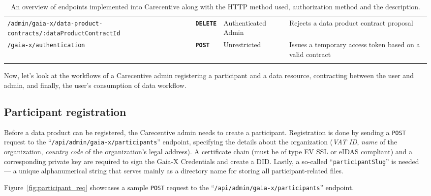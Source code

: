 \begin{longtable}{ |p{4cm}|p{2cm}|p{3cm}|p{6cm}| }
    \hhline{----}
    \texttt{/admin/gaia-x/data-product-contracts/:dataProductContractId} & \textbf{\texttt{DELETE}} & Authenticated Admin & Rejects a data product contract proposal\\
    \hhline{----}
    \texttt{/gaia-x/authentication} & \textbf{\texttt{POST}} & Unrestricted & Issues a temporary access token based on a valid contract\\
    \hhline{----}
    \caption{An overview of endpoints implemented into Carecentive along with the HTTP method used, authorization method and the description.}
    \label{tab:endpoints}
\end{longtable}

Now, let's look at the workflows of a Carecentive admin registering a participant and a data resource, contracting between the user and admin, and finally, the user's consumption of data workflow.

\subsection{Participant registration}\label{subsec:participant-registration}

Before a data product can be registered, the Carecentive admin needs to create a participant.
Registration is done by sending a \texttt{POST} request to the ``\texttt{/api/admin/gaia-x/participants}'' endpoint, specifying the details about the organization (\textit{VAT ID}, \textit{name} of the organization, \textit{country code} of the organization's legal address).
A certificate chain (must be of type EV SSL or eIDAS compliant) and a corresponding private key are required to sign the Gaia-X Credentials and create a DID.
Lastly, a so-called ``\texttt{participantSlug}'' is needed --- a unique alphanumerical string that serves mainly as a directory name for storing all participant-related files.

Figure~\ref{fig:participant_req} showcases a sample \texttt{POST} request to the ``\texttt{/api/admin/gaia-x/participants}'' endpoint.

